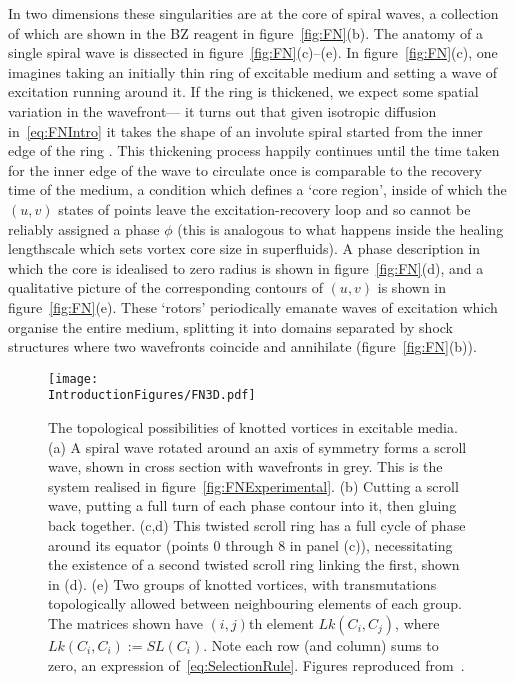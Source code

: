 In two dimensions these singularities are at the core of spiral waves, a collection of which are shown in the BZ reagent in figure~\ref{fig:FN}(b). The anatomy of a single spiral wave is dissected in figure~\ref{fig:FN}(c)--(e). In figure~\ref{fig:FN}(c), one imagines taking an initially thin ring of excitable medium and setting a wave of excitation running around it. If the ring is thickened, we expect some spatial variation in the wavefront--- it turns out that given isotropic diffusion in~\eqref{eq:FNIntro} it takes the shape of an involute spiral started from the inner edge of the ring \citep{WinfreeBook}. This thickening process happily continues until the time taken for the inner edge of the wave to circulate once is comparable to the recovery time of the medium, a condition which defines a `core region', inside of which the $(u,v)$ states of points leave the excitation-recovery loop and so cannot be reliably assigned a phase $\phi$ (this is analogous to what happens inside the healing lengthscale which sets vortex core size in superfluids). A phase description in which the core is idealised to zero radius is shown in figure~\ref{fig:FN}(d), and a qualitative picture of the corresponding contours of $(u,v)$ is shown in figure~\ref{fig:FN}(e). These `rotors' periodically emanate waves of excitation which organise the entire medium, splitting it into domains separated by shock structures where two wavefronts coincide and annihilate (figure~\ref{fig:FN}(b)).
\begin{figure}[htbp]
\centering
\texttt{[image: \\IntroductionFigures/FN3D.pdf]}
\caption[The possibilities of knotted vortices in excitable media.]{The topological possibilities of knotted vortices in excitable media. (a) A spiral wave rotated around an axis of symmetry forms a scroll wave, shown in cross section with wavefronts in grey. This is the system realised in figure~\ref{fig:FNExperimental}. (b) Cutting a scroll wave, putting a full turn of each phase contour into it, then gluing back together. (c,d) This twisted scroll ring has a full cycle of phase around its equator (points $0$ through $8$ in panel (c)), necessitating the existence of a second twisted scroll ring linking the first, shown in (d). (e) Two groups of knotted vortices, with transmutations topologically allowed between neighbouring elements of each group. The matrices shown have $(i,j)$th element $Lk(C_i,C_j)$, where $Lk(C_i,C_i):= SL(C_i)$. Note each row (and column) sums to zero, an expression of~\eqref{eq:SelectionRule}. Figures reproduced from~\citep{Winfree1983, Winfree1983b, Winfree1990}.}
\label{fig:FN3D}
\end{figure}

